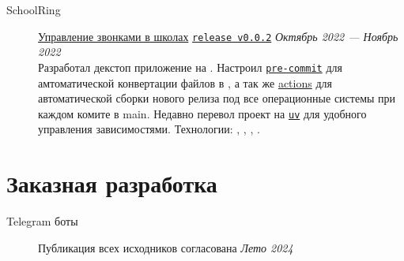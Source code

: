\documentclass[margin,line]{resume}
\begin{document}
\begin{resume}
\begin{description}
      \vspace{3mm}

    \item[SchoolRing]\small{\href{https://github.com/alchemmist/school-ring}{Управление
        звонками в школах}
        \begingroup
        \hypersetup{urlcolor=blue!30}
        \href{https://github.com/}{\texttt{release v0.0.2}}
        \endgroup
        \hfill
      \textsl{Октябрь 2022 — Ноябрь 2022\vspace{1mm}}}\\
      Разработал декстоп приложение на . Настроил
      \href{https://github.com}{\texttt{pre-commit}} для
      амтоматической конвертации  файлов в
      , а так же \href{https://github.com}{actions}
      для автоматической сборки нового релиза под все
      операционные системы при каждом комите в main. Недавно перевол
      проект на \href{https://astral.sh/blog/uv}{\texttt{uv}} для
      удобного управления зависимостями.
      Технологии:
      , ,
      , .

  \end{description}

  \section{\mysidestyle Заказная разработка}\vspace{2mm}

  \begin{description}
    \item[Telegram боты]\small{
        \begingroup
        \textcolor{gray!60}{Публикация всех исходников согласована}
        \endgroup
      }{\hfill
      \textsl{Лето 2024}}\vspace{2mm}
\end{description}
\end{resume}
\end{document}
